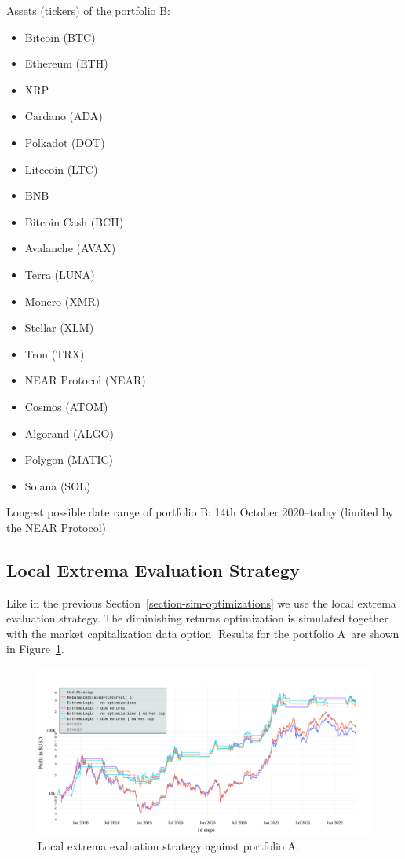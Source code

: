 Assets (tickers) of the portfolio B:
\begin{itemize}
    \item Bitcoin (BTC)
    \item Ethereum (ETH)
    \item XRP
    \item Cardano (ADA)
    \item Polkadot (DOT)
    \item Litecoin (LTC)
    \item BNB
    \item Bitcoin Cash (BCH)
    \item Avalanche (AVAX)
    \item Terra (LUNA)
    \item Monero (XMR)
    \item Stellar (XLM)
    \item Tron (TRX)
    \item NEAR Protocol (NEAR)
    \item Cosmos (ATOM)
    \item Algorand (ALGO)
    \item Polygon (MATIC)
    \item Solana (SOL)

\end{itemize}
Longest possible date range of portfolio B: 14th October 2020--today (limited by the NEAR Protocol)

\subsection*{Local Extrema Evaluation Strategy}
Like in the previous Section~\ref{section-sim-optimizations} we use the local extrema evaluation strategy. The diminishing returns optimization is simulated together with the market capitalization data option. Results for the portfolio A~are shown in Figure~\ref{figure-extrema-portfolio-A}.

\begin{figure}[!hbt]
    \centering
    \includegraphics[width=\columnwidth]{figures/extrema-portfolio-A.pdf}
    \caption{Local extrema evaluation strategy against portfolio A.}
    \label{figure-extrema-portfolio-A}
\end{figure}

